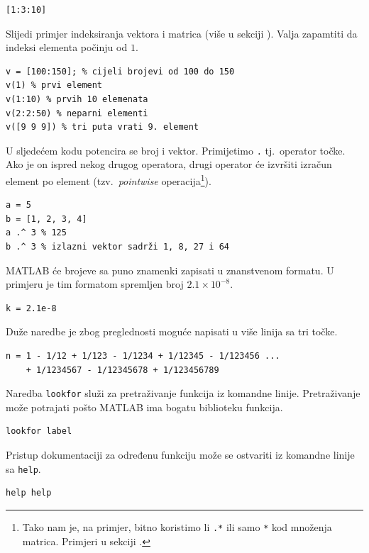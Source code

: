 \documentclass[a4paper, 10pt]{article}
\begin{document}
\begin{lstlisting}
[1:3:10]
\end{lstlisting}

Slijedi primjer indeksiranja vektora i matrica (više u sekciji ).
Valja zapamtiti da indeksi elementa počinju od $1$.

\begin{lstlisting}
v = [100:150]; % cijeli brojevi od 100 do 150
v(1) % prvi element
v(1:10) % prvih 10 elemenata
v(2:2:50) % neparni elementi
v([9 9 9]) % tri puta vrati 9. element
\end{lstlisting}

U sljedećem kodu potencira se broj i vektor.
Primijetimo \texttt{.} tj.\ operator točke.
Ako je on ispred nekog drugog operatora, drugi operator će izvršiti izračun element po element (tzv.\ \emph{pointwise} operacija\footnote{Tako nam je, na primjer, bitno koristimo li \texttt{.*} ili samo \texttt{*} kod množenja matrica.
Primjeri u sekciji .}).

\begin{lstlisting}
a = 5
b = [1, 2, 3, 4]
a .^ 3 % 125
b .^ 3 % izlazni vektor sadrži 1, 8, 27 i 64
\end{lstlisting}

MATLAB će brojeve sa puno znamenki zapisati u znanstvenom formatu.
U primjeru je tim formatom spremljen broj $2.1 \times 10^{-8}$.

\begin{lstlisting}
k = 2.1e-8
\end{lstlisting}

Duže naredbe je zbog preglednosti moguće napisati u više linija sa tri točke.

\begin{lstlisting}
n = 1 - 1/12 + 1/123 - 1/1234 + 1/12345 - 1/123456 ...
    + 1/1234567 - 1/12345678 + 1/123456789
\end{lstlisting}

Naredba \texttt{lookfor} služi za pretraživanje funkcija iz komandne linije.
Pretraživanje može potrajati pošto MATLAB ima bogatu biblioteku funkcija.

\begin{lstlisting}
lookfor label
\end{lstlisting}

Pristup dokumentaciji za određenu funkciju može se ostvariti iz komandne linije sa \texttt{help}.

\begin{lstlisting}
help help
\end{lstlisting}
\end{document}
